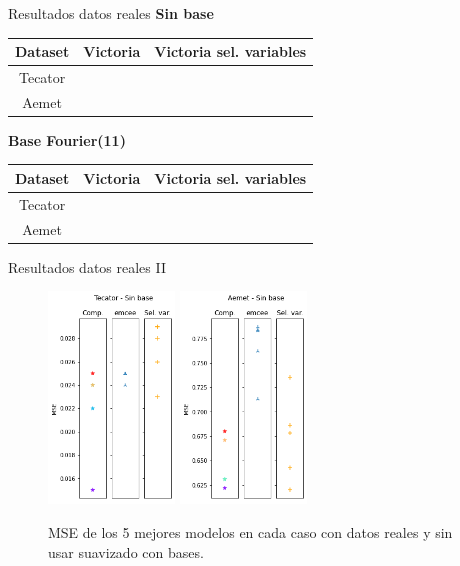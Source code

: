 \documentclass[10pt, spanish, professionalfonts]{beamer}
\newcommand{\cmark}{\ding{51}}%
\newcommand{\xmark}{\ding{55}}%
\begin{document}
\begin{frame}{Resultados datos reales}
\textbf{Sin base}
  \begin{table}
    \begin{tabular}{c|cc}
      Dataset & Victoria & Victoria sel. variables \\ \hline
      Tecator & \xmark & \xmark\\
      Aemet & \xmark & \cmark\\
    \end{tabular}
  \end{table}

  \textbf{Base Fourier(11)}
  \begin{table}
    \begin{tabular}{c|cc}
      Dataset & Victoria & Victoria sel. variables \\ \hline
      Tecator & \xmark &  \xmark\\
      Aemet & \xmark & \cmark\\
    \end{tabular}
  \end{table}
\end{frame}

\begin{frame}{Resultados datos reales II}
  \begin{figure}
    \includegraphics[width=0.3\textwidth]{img/results/lin_tecator_nobase}\hspace{5em}
    \includegraphics[width=0.3\textwidth]{img/results/lin_aemet_nobase}
    \caption{MSE de los 5 mejores modelos en cada caso con datos reales y sin usar suavizado con bases.}
  \end{figure}
\end{frame}
\end{document}
